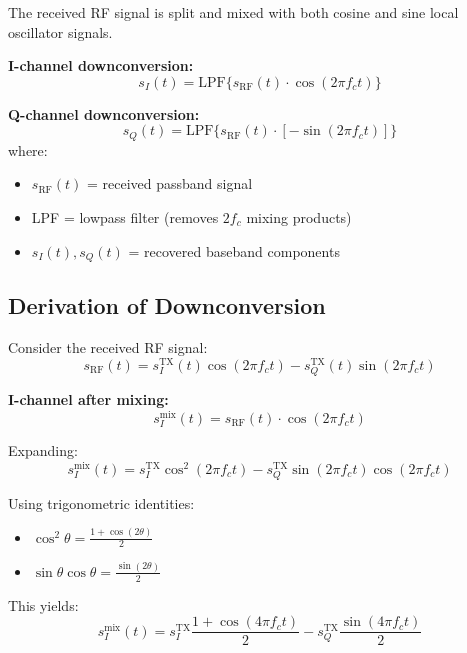 The received RF signal is split and mixed with both cosine and sine local oscillator signals.

\textbf{I-channel downconversion:}
\begin{equation}
s_I(t) = \text{LPF}\{s_{\text{RF}}(t) \cdot \cos(2\pi f_c t)\}
\end{equation}

\textbf{Q-channel downconversion:}
\begin{equation}
s_Q(t) = \text{LPF}\{s_{\text{RF}}(t) \cdot [-\sin(2\pi f_c t)]\}
\end{equation}
where:
\begin{itemize}
\item $s_{\text{RF}}(t)$ = received passband signal
\item LPF = lowpass filter (removes $2f_c$ mixing products)
\item $s_I(t), s_Q(t)$ = recovered baseband components
\end{itemize}

\subsection{Derivation of Downconversion}

Consider the received RF signal:
\begin{equation}
s_{\text{RF}}(t) = s_I^{\text{TX}}(t)\cos(2\pi f_c t) - s_Q^{\text{TX}}(t)\sin(2\pi f_c t)
\end{equation}

\textbf{I-channel after mixing:}
\begin{equation}
s_I^{\text{mix}}(t) = s_{\text{RF}}(t) \cdot \cos(2\pi f_c t)
\end{equation}

Expanding:
\begin{equation}
s_I^{\text{mix}}(t) = s_I^{\text{TX}}\cos^2(2\pi f_c t) - s_Q^{\text{TX}}\sin(2\pi f_c t)\cos(2\pi f_c t)
\end{equation}

Using trigonometric identities:
\begin{itemize}
\item $\cos^2\theta = \frac{1 + \cos(2\theta)}{2}$
\item $\sin\theta\cos\theta = \frac{\sin(2\theta)}{2}$
\end{itemize}

This yields:
\begin{equation}
s_I^{\text{mix}}(t) = s_I^{\text{TX}}\frac{1 + \cos(4\pi f_c t)}{2} - s_Q^{\text{TX}}\frac{\sin(4\pi f_c t)}{2}
\end{equation}

